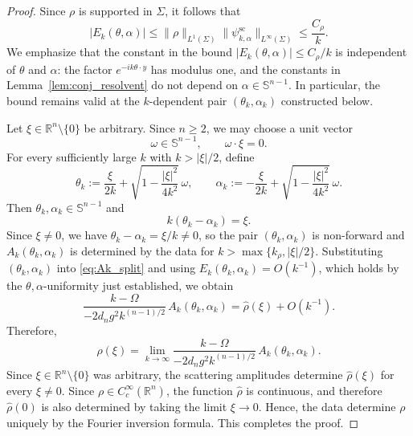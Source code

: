 \documentclass[12pt,a4paper]{amsart}
\numberwithin{equation}{section}
\theoremstyle{plain}
\theoremstyle{definition}
\begin{document}
\begin{proof}
Since $\rho$ is supported in $\Sigma$, it follows that
\begin{equation}\label{eq:Ak_split_bound_reminder}
|E_k(\theta,\alpha)|
\leq
\|\rho\|_{L^1(\Sigma)}
\|\psi^{\mathrm{sc}}_{k,\alpha}\|_{L^\infty(\Sigma)}
\leq
\frac{C_{\rho}}{k}.
\end{equation}
We emphasize that the constant in the bound $|E_k(\theta,\alpha)|\le C_\rho/k$ is independent of $\theta$ and $\alpha$:
the factor $e^{-ik\theta\cdot y}$ has modulus one, and the constants in
Lemma~\ref{lem:conj_resolvent} do not depend on $\alpha\in\mathbb{S}^{n-1}$. In
particular, the bound remains valid at the $k$-dependent pair
$(\theta_k,\alpha_k)$ constructed below.

Let $\xi\in\mathbb R^n\setminus\{0\}$ be arbitrary. Since $n\geq 2$, we may choose a unit vector
\begin{equation*}
    \omega \in \mathbb{S}^{n-1},
    \qquad
    \omega \cdot \xi = 0.
\end{equation*}
For every sufficiently large $k$ with $k > |\xi|/2$, define
\begin{equation*}
    \theta_k
    :=
    \frac{\xi}{2k}
    +
    \sqrt{1-\frac{|\xi|^2}{4k^2}}\,\omega,
    \qquad
    \alpha_k
    :=
    -\frac{\xi}{2k}
    +
    \sqrt{1-\frac{|\xi|^2}{4k^2}}\,\omega.
\end{equation*}
Then $\theta_k,\alpha_k \in \mathbb{S}^{n-1}$ and
\begin{equation*}
    k(\theta_k-\alpha_k)=\xi.
\end{equation*}
Since $\xi\neq0$, we have $\theta_k-\alpha_k=\xi/k\neq0$, so the pair
$(\theta_k,\alpha_k)$ is non-forward and $A_k(\theta_k,\alpha_k)$ is determined
by the data for $k>\max\{k_\rho,|\xi|/2\}$. Substituting $(\theta_k,\alpha_k)$
into \eqref{eq:Ak_split} and using $E_k(\theta_k,\alpha_k)=O(k^{-1})$, which
holds by the $\theta,\alpha$-uniformity just established, we obtain
\begin{equation}\label{eq:Ak_high_freq_here}
    \frac{k-\Omega}{-2d_n g^2 k^{(n-1)/2}}\,A_k(\theta_k,\alpha_k)
    =
    \hat{\rho}(\xi)
    +
    O(k^{-1}).
\end{equation}
Therefore,
\begin{equation*}
    \hat{\rho}(\xi)
    =
    \lim_{k\to\infty}
    \frac{k-\Omega}{-2d_n g^2 k^{(n-1)/2}}\,A_k(\theta_k,\alpha_k).
\end{equation*}
Since $\xi \in \mathbb{R}^n\setminus\{0\}$ was arbitrary, the scattering amplitudes determine $\widehat{\rho}(\xi)$ for every
$\xi\ne0$. Since $\rho\in C_c^\infty(\mathbb R^n)$, the function
$\widehat{\rho}$ is continuous, and therefore $\widehat{\rho}(0)$ is also
determined by taking the limit $\xi\to 0$. Hence, the data determine $\rho$
uniquely by the Fourier inversion formula. This completes the proof.
\end{proof}
\end{document}
